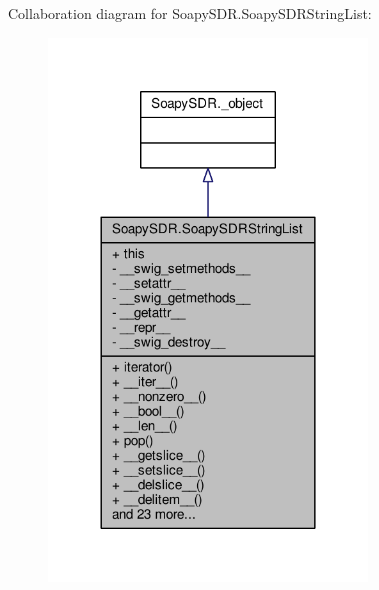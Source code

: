 Collaboration diagram for Soapy\+S\+D\+R.\+Soapy\+S\+D\+R\+String\+List\+:
\nopagebreak
\begin{figure}[H]
\begin{center}
\leavevmode
\includegraphics[width=240pt]{d9/d9e/classSoapySDR_1_1SoapySDRStringList__coll__graph}
\end{center}
\end{figure}
